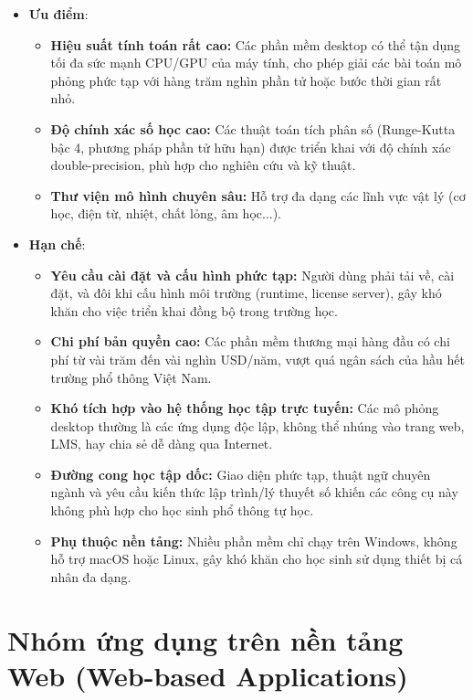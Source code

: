 \begin{itemize}
    \item \textbf{Ưu điểm}:
    \begin{itemize}
        \item \textbf{Hiệu suất tính toán rất cao:} Các phần mềm desktop có thể tận dụng tối đa sức mạnh CPU/GPU của máy tính, cho phép giải các bài toán mô phỏng phức tạp với hàng trăm nghìn phần tử hoặc bước thời gian rất nhỏ.
        \item \textbf{Độ chính xác số học cao:} Các thuật toán tích phân số (Runge-Kutta bậc 4, phương pháp phần tử hữu hạn) được triển khai với độ chính xác double-precision, phù hợp cho nghiên cứu và kỹ thuật.
        \item \textbf{Thư viện mô hình chuyên sâu:} Hỗ trợ đa dạng các lĩnh vực vật lý (cơ học, điện từ, nhiệt, chất lỏng, âm học...).
    \end{itemize}
    \item \textbf{Hạn chế}:
    \begin{itemize}
        \item \textbf{Yêu cầu cài đặt và cấu hình phức tạp:} Người dùng phải tải về, cài đặt, và đôi khi cấu hình môi trường (runtime, license server), gây khó khăn cho việc triển khai đồng bộ trong trường học.
        \item \textbf{Chi phí bản quyền cao:} Các phần mềm thương mại hàng đầu có chi phí từ vài trăm đến vài nghìn USD/năm, vượt quá ngân sách của hầu hết trường phổ thông Việt Nam.
        \item \textbf{Khó tích hợp vào hệ thống học tập trực tuyến:} Các mô phỏng desktop thường là các ứng dụng độc lập, không thể nhúng vào trang web, LMS, hay chia sẻ dễ dàng qua Internet.
        \item \textbf{Đường cong học tập dốc:} Giao diện phức tạp, thuật ngữ chuyên ngành và yêu cầu kiến thức lập trình/lý thuyết số khiến các công cụ này không phù hợp cho học sinh phổ thông tự học.
        \item \textbf{Phụ thuộc nền tảng:} Nhiều phần mềm chỉ chạy trên Windows, không hỗ trợ macOS hoặc Linux, gây khó khăn cho học sinh sử dụng thiết bị cá nhân đa dạng.
    \end{itemize}
\end{itemize}

\section{Nhóm ứng dụng trên nền tảng Web (Web-based Applications)}

